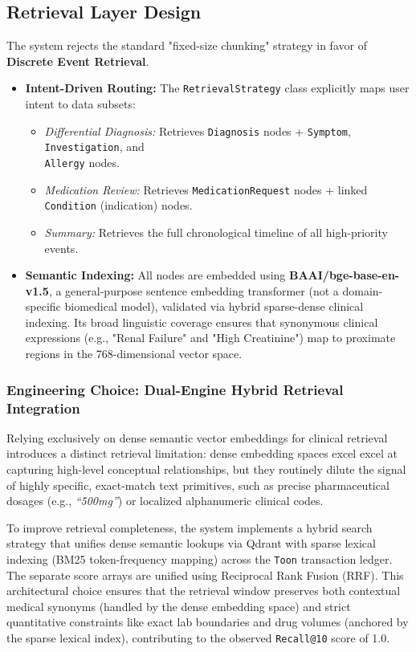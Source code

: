 \subsection{Retrieval Layer Design}
The system rejects the standard "fixed-size chunking" strategy in favor of \textbf{Discrete Event Retrieval}.
\begin{itemize}
    \item \textbf{Intent-Driven Routing:} The \texttt{RetrievalStrategy} class explicitly maps user intent to data subsets:
    \begin{itemize}
        \item \emph{Differential Diagnosis:} Retrieves \texttt{Diagnosis} nodes + \texttt{Symptom}, \texttt{Investigation}, and \\ \hspace*{1.5em} \texttt{Allergy} nodes.
        \item \emph{Medication Review:} Retrieves \texttt{MedicationRequest} nodes + linked \texttt{Condition} (indication) nodes.
        \item \emph{Summary:} Retrieves the full chronological timeline of all high-priority events.
    \end{itemize}
    \item \textbf{Semantic Indexing:} All nodes are embedded using \textbf{BAAI/bge-base-en-v1.5}, a general-purpose sentence embedding transformer (not a domain-specific biomedical model), validated via hybrid sparse-dense clinical indexing. Its broad linguistic coverage ensures that synonymous clinical expressions (e.g., "Renal Failure" and "High Creatinine") map to proximate regions in the 768-dimensional vector space.
\end{itemize}

\subsubsection{Engineering Choice: Dual-Engine Hybrid Retrieval Integration}
Relying exclusively on dense semantic vector embeddings for clinical retrieval introduces a distinct retrieval limitation: dense embedding spaces excel excel at capturing high-level conceptual relationships, but they routinely dilute the signal of highly specific, exact-match text primitives, such as precise pharmaceutical dosages (e.g., \textit{``500mg''}) or localized alphanumeric clinical codes.

To improve retrieval completeness, the system implements a hybrid search strategy that unifies dense semantic lookups via Qdrant with sparse lexical indexing (BM25 token-frequency mapping) across the \texttt{Toon} transaction ledger. The separate score arrays are unified using Reciprocal Rank Fusion (RRF). This architectural choice ensures that the retrieval window preserves both contextual medical synonyms (handled by the dense embedding space) and strict quantitative constraints like exact lab boundaries and drug volumes (anchored by the sparse lexical index), contributing to the observed \texttt{Recall@10} score of 1.0.

